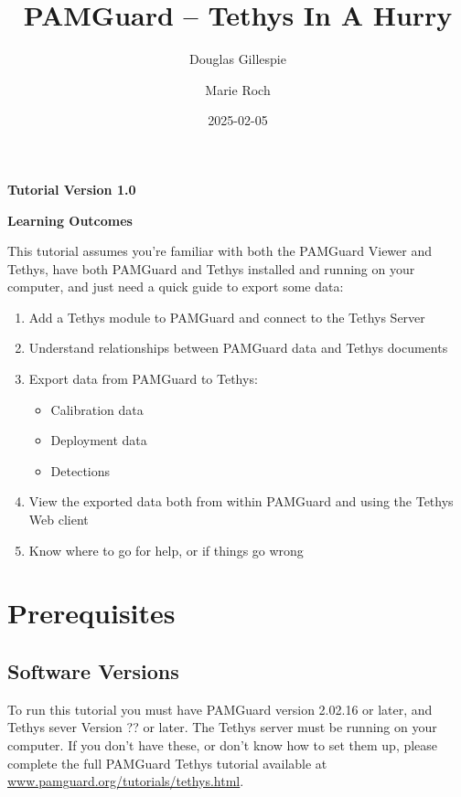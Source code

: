\documentclass[
]{article}
\title{PAMGuard -- Tethys In A Hurry}
\author[1]{Douglas Gillespie}
\author[2]{Marie Roch}
\affil[1]{Sea Mammal Research Unit, University of St Andrews}
\affil[2]{Department of Computer Science, San Diego State University}
\date{2025-02-05}
\renewcommand*\contentsname{Table of contents}
\newcommand\contentsname{Table of contents}
\begin{document}
\maketitle

\centerline{\textbf{Tutorial Version 1.0}}
\vspace{3cm}

\centerline{\textbf{Learning Outcomes}}

This tutorial assumes you're familiar with both the PAMGuard Viewer and Tethys,
have both PAMGuard and Tethys installed and
running on your computer, and just need a quick guide to export some data:
\begin{enumerate}
\item Add a Tethys module to PAMGuard and connect to the Tethys Server
\item Understand relationships between PAMGuard data and Tethys documents
\item Export data from PAMGuard to Tethys:
\begin{itemize}
\item Calibration data
\item Deployment data
\item Detections
\end{itemize}
\item View the exported data both from within PAMGuard and using the Tethys Web client
\item Know where to go for help, or if things go wrong
\end{enumerate}
\newpage

\renewcommand*\contentsname{Table of contents}
{
\hypersetup{linkcolor=}
\setcounter{tocdepth}{3}
\tableofcontents
}
\listoffigures
\listoftables

\newpage{}

\pagestyle{plain}

\section{Prerequisites}\label{prerequisites}

\subsection{Software Versions}\label{software-versions}

To run this tutorial you must have PAMGuard version 2.02.16 or later,
and Tethys sever Version ?? or later. The Tethys server must be running
on your computer. If you don't have these, or don't know how to set them
up, please complete the full PAMGuard Tethys tutorial available at
\href{https://www.pamguard.org/tutorials/tethys.html}{www.pamguard.org/tutorials/tethys.html}.
\end{document}
